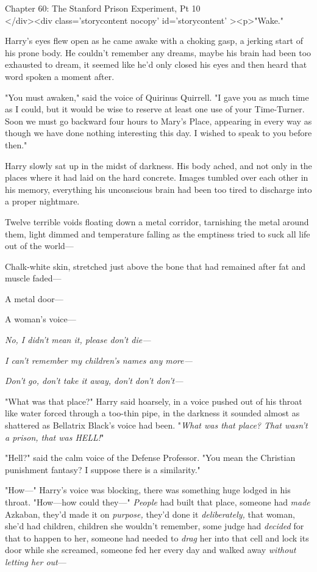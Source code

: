 
Chapter 60: The Stanford Prison Experiment, Pt 10\\
</div><div  class='storycontent nocopy' id='storycontent' ><p>"Wake."

Harry's eyes flew open as he came awake with a choking gasp, a jerking start of 
his prone body. He couldn't remember any dreams, maybe his brain had been too 
exhausted to dream, it seemed like he'd only closed his eyes and then heard 
that word spoken a moment after.

"You must awaken," said the voice of Quirinus Quirrell. "I gave you as much 
time as I could, but it would be wise to reserve at least one use of your 
Time-Turner. Soon we must go backward four hours to Mary's Place, appearing in 
every way as though we have done nothing interesting this day. I wished to 
speak to you before then."

Harry slowly sat up in the midst of darkness. His body ached, and not only in 
the places where it had laid on the hard concrete. Images tumbled over each 
other in his memory, everything his unconscious brain had been too tired to 
discharge into a proper nightmare.

Twelve terrible voids floating down a metal corridor, tarnishing the metal 
around them, light dimmed and temperature falling as the emptiness tried to 
suck all life out of the world---

Chalk-white skin, stretched just above the bone that had remained after fat and 
muscle faded---

A metal door---

A woman's voice---

\emph{No, I didn't mean it, please don't die---}

\emph{I can't remember my children's names any more---}

\emph{Don't go, don't take it away, don't don't don't---}

"What was that place?" Harry said hoarsely, in a voice pushed out of his throat 
like water forced through a too-thin pipe, in the darkness it sounded almost as 
shattered as Bellatrix Black's voice had been. "\emph{What was that place? That 
wasn't a prison, that was HELL!}"

"Hell?" said the calm voice of the Defense Professor. "You mean the Christian 
punishment fantasy? I suppose there is a similarity."

"How---" Harry's voice was blocking, there was something huge lodged in his 
throat. "How---how could they---" \emph{People} had built that place, someone 
had \emph{made} Azkaban, they'd made it on \emph{purpose,} they'd done it 
\emph{deliberately,} that woman, she'd had children, children she wouldn't 
remember, some judge had \emph{decided} for that to happen to her, someone had 
needed to \emph{drag} her into that cell and lock its door while she screamed, 
someone fed her every day and walked away \emph{without letting her out}---

